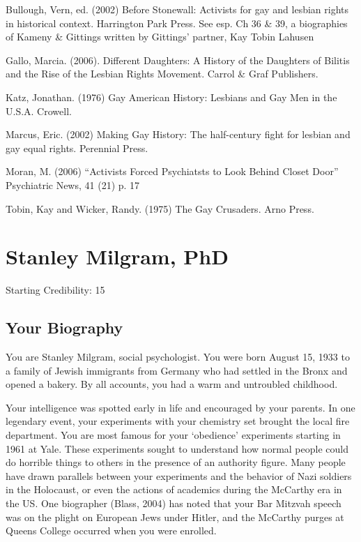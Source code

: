 \begin{refsection}
Bullough, Vern, ed. (2002) Before Stonewall: Activists for gay and lesbian rights in historical context. Harrington Park Press. See esp. Ch 36 \& 39, a biographies of Kameny \& Gittings written by Gittings' partner, Kay Tobin Lahusen

Gallo, Marcia. (2006). Different Daughters: A History of the Daughters of Bilitis and the Rise of the Lesbian Rights Movement. Carrol \& Graf Publishers.

Katz, Jonathan. (1976) Gay American History: Lesbians and Gay Men in the U.S.A. Crowell.

Marcus, Eric. (2002) Making Gay History: The half-century fight for lesbian and gay equal rights. Perennial Press.

Moran, M. (2006) “Activists Forced Psychiatsts to Look Behind Closet Door” Psychiatric News, 41 (21) p. 17

Tobin, Kay and Wicker, Randy. (1975) The Gay Crusaders. Arno Press.

\chapter{Stanley Milgram, PhD}
\label{stanleymilgramphd}

Starting Credibility: 15

\section{Your Biography}
\label{yourbiography}

You are Stanley Milgram, social psychologist. You were born August 15, 1933 to a family of Jewish immigrants from Germany who had settled in the Bronx and opened a bakery. By all accounts, you had a warm and untroubled childhood.

Your intelligence was spotted early in life and encouraged by your parents. In one legendary event, your experiments with your chemistry set brought the local fire department. You are most famous for your `obedience' experiments starting in 1961 at Yale. These experiments sought to understand how normal people could do horrible things to others in the presence of an authority figure. Many people have drawn parallels between your experiments and the behavior of Nazi soldiers in the Holocaust, or even the actions of academics during the McCarthy era in the US. One biographer (Blass, 2004) has noted that your Bar Mitzvah speech was on the plight on European Jews under Hitler, and the McCarthy purges at Queens College occurred when you were enrolled.


\end{refsection}
